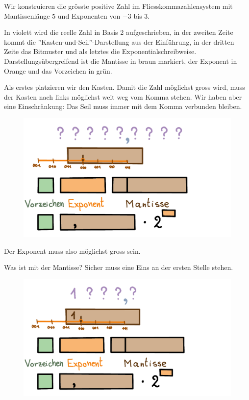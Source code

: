 \begin{beispiel}
Wir konstruieren die grösste positive Zahl im Fliesskommazahlensystem mit Mantissenlänge \(5\) und Exponenten von \(-3\) bis \(3\).

In violett wird die reelle Zahl in Basis 2 aufgeschrieben, in der zweiten Zeite kommt die ''Kasten-und-Seil''-Darstellung aus der Einführung, in der dritten Zeite das Bitmuster und als letztes die Exponentialschreibweise. Darstellungsübergreifend ist die Mantisse in braun markiert, der Exponent in Orange und das Vorzeichen in grün.

Als erstes platzieren wir den Kasten. Damit die Zahl möglichst gross wird, muss der Kasten nach links möglichst weit weg vom Komma stehen. Wir haben aber eine Einschränkung: Das Seil muss immer mit dem Komma verbunden bleiben.
\begin{figure}[H]
\centering
\includegraphics[width=0.85\linewidth]{Pictures/groessteZahl1.png}
\end{figure}
Der Exponent muss also möglichst gross sein.

Was ist mit der Mantisse? Sicher muss eine Eins an der ersten Stelle stehen.
\begin{figure}[H]
\centering
\includegraphics[width=0.85\linewidth]{Pictures/groessteZahl2.png}
\end{figure}


\end{beispiel}
